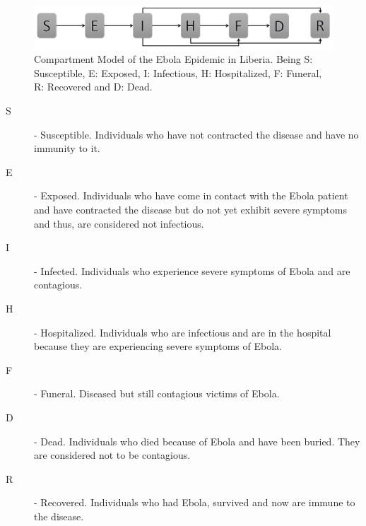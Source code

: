 \begin{figure}[!h]
  \centering
  \includegraphics[width=1\textwidth]{compartmentNoFlow}
  \caption{Compartment Model of the Ebola Epidemic in Liberia. \newline  Being S: Susceptible, E: Exposed, I: Infectious, H: Hospitalized, F: Funeral,  R: Recovered and D: Dead.  } 
\label{fig:compartmentNoFlow} 
\end{figure}

\begin{description}
\item[S]- Susceptible. Individuals who have not contracted the disease and have no immunity to it. 
\item[E] - Exposed. Individuals who have come in contact with the Ebola patient and have contracted the disease but do not yet exhibit severe symptoms and thus, are considered not infectious.
\item[I] - Infected. Individuals who experience severe symptoms of Ebola and are contagious.
\item[H] - Hospitalized. Individuals who are infectious and are in the hospital because they are experiencing severe symptoms of Ebola.
\item[F] - Funeral. Diseased but still contagious victims of Ebola. 
\item[D] - Dead. Individuals who died because of Ebola and have been buried. They are considered not to be contagious.
\item[R] - Recovered. Individuals who had Ebola, survived and now are immune to the disease.
\end{description}




